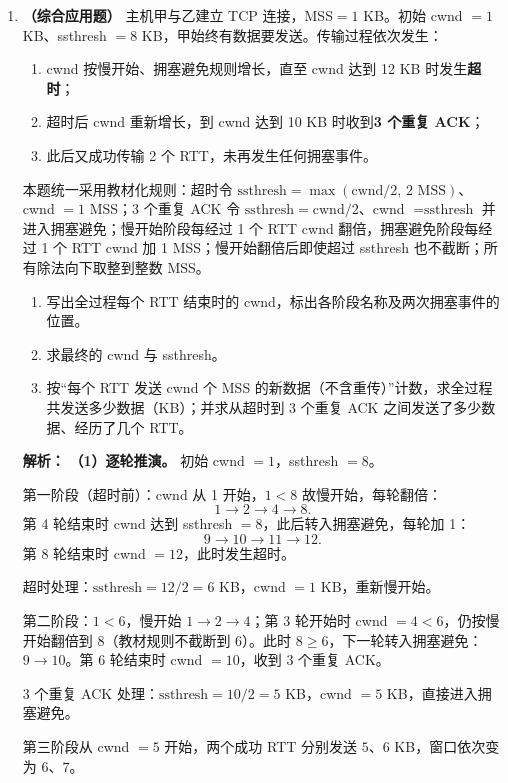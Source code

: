 \begin{enumerate}
\item \textbf{（综合应用题）} 主机甲与乙建立 TCP 连接，MSS$=1$ KB。初始 cwnd $=1$ KB、ssthresh $=8$ KB，甲始终有数据要发送。传输过程依次发生：

\begin{enumerate}
\item[(i)] cwnd 按慢开始、拥塞避免规则增长，直至 cwnd 达到 12 KB 时发生\textbf{超时}；
\item[(ii)] 超时后 cwnd 重新增长，到 cwnd 达到 10 KB 时收到\textbf{3 个重复 ACK}；
\item[(iii)] 此后又成功传输 2 个 RTT，未再发生任何拥塞事件。
\end{enumerate}

本题统一采用教材化规则：超时令 $\text{ssthresh}=\max(\text{cwnd}/2,\,2\text{ MSS})$、cwnd $=1$ MSS；3 个重复 ACK 令 $\text{ssthresh}=\text{cwnd}/2$、cwnd $=\text{ssthresh}$ 并进入拥塞避免；慢开始阶段每经过 1 个 RTT cwnd 翻倍，拥塞避免阶段每经过 1 个 RTT cwnd 加 1 MSS；慢开始翻倍后即使超过 ssthresh 也不截断；所有除法向下取整到整数 MSS。

\begin{enumerate}
\item[(1)] 写出全过程每个 RTT 结束时的 cwnd，标出各阶段名称及两次拥塞事件的位置。
\item[(2)] 求最终的 cwnd 与 ssthresh。
\item[(3)] 按“每个 RTT 发送 cwnd 个 MSS 的新数据（不含重传）”计数，求全过程共发送多少数据（KB）；并求从超时到 3 个重复 ACK 之间发送了多少数据、经历了几个 RTT。
\end{enumerate}

\ifshowsolutions\par\noindent\textbf{解析：}
\textbf{（1）逐轮推演。} 初始 cwnd $=1$，ssthresh $=8$。

第一阶段（超时前）：cwnd 从 1 开始，$1<8$ 故慢开始，每轮翻倍：
\[
1\to2\to4\to8.
\]
第 4 轮结束时 cwnd 达到 ssthresh $=8$，此后转入拥塞避免，每轮加 1：
\[
9\to10\to11\to12.
\]
第 8 轮结束时 cwnd $=12$，此时发生超时。

超时处理：$\text{ssthresh}=12/2=6$ KB，cwnd $=1$ KB，重新慢开始。

第二阶段：$1<6$，慢开始 $1\to2\to4$；第 3 轮开始时 cwnd $=4<6$，仍按慢开始翻倍到 8（教材规则不截断到 6）。此时 $8\geqslant6$，下一轮转入拥塞避免：$9\to10$。第 6 轮结束时 cwnd $=10$，收到 3 个重复 ACK。

3 个重复 ACK 处理：$\text{ssthresh}=10/2=5$ KB，cwnd $=5$ KB，直接进入拥塞避免。

第三阶段从 cwnd $=5$ 开始，两个成功 RTT 分别发送 $5$、$6$ KB，窗口依次变为 $6$、$7$。


\end{enumerate}
